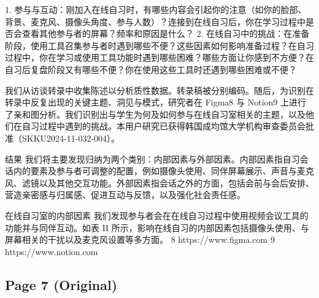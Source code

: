 \documentclass[12pt]{ctexart}
\begin{document}
1. 参与与互动：刚加入在线自习时，有哪些内容会引起你的注意（如你的脸部、背景、麦克风、摄像头角度、参与人数）？连接到在线自习后，你在学习过程中是否会查看其他参与者的屏幕？频率和原因是什么？
2. 在线自习中的挑战：在准备阶段，使用工具召集参与者时遇到哪些不便？这些因素如何影响准备过程？在自习过程中，你在学习或使用工具功能时遇到哪些困难？哪些方面让你感到不方便？在自习后复盘阶段又有哪些不便？你在使用这些工具时还遇到哪些困难或不便？

我们从访谈转录中收集陈述以分析质性数据。转录稿被分别编码。随后，为识别在转录中反复出现的关键主题、洞见与模式，研究者在 Figma8 与 Notion9 上进行了亲和图分析。我们识别出与学生为何及如何参与在线自习室相关的主题，以及他们在自习过程中遇到的挑战。本用户研究已获得韩国成均馆大学机构审查委员会批准（SKKU2024-11-032-004）。

结果
我们将主要发现归纳为两个类别：内部因素与外部因素。内部因素指自习会话内的要素及参与者可调整的配置，例如摄像头使用、同伴屏幕展示、声音与麦克风、滤镜以及其他交互功能。外部因素指会话之外的方面，包括会前与会后安排、营造亲密感与归属感、促进互动与反馈，以及强化社会责任感。

在线自习室的内部因素
我们发现参与者会在在线自习过程中使用视频会议工具的功能并与同伴互动。如表 II 所示，影响在线自习的内部因素包括摄像头使用、与屏幕相关的干扰以及麦克风设置等多方面。
8 https://www.figma.com
9 https://www.notion.com

\subsection*{Page 7 (Original)}
\end{document}
